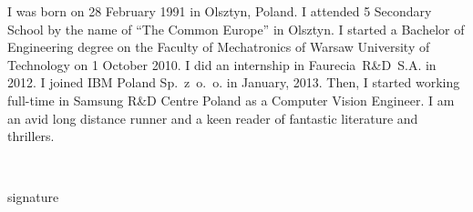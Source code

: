 	I was born on 28 February 1991 in Olsztyn, Poland. I attended 5 Secondary School by the name of ``The Common Europe'' in Olsztyn. I started a Bachelor of Engineering degree on the Faculty of Mechatronics of Warsaw University of Technology on 1 October 2010. I did an internship in Faurecia~R\&D~S.A. in 2012. I joined IBM Poland Sp.~z~o.~o. in January, 2013. Then, I started working full-time in Samsung R\&D Centre Poland as a Computer Vision Engineer. I am an avid long distance runner and a keen reader of fantastic literature and thrillers.
	
    \par
    \vspace{3\baselineskip}
    \hfill\parbox{15em}{{\small\dotfill}\\[-.3ex]
    \centerline{\footnotesize signature}}\par
    \vspace{3\baselineskip}